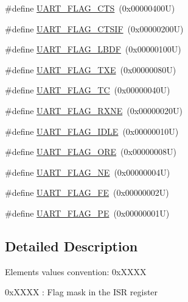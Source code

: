\begin{DoxyCompactItemize}
\item 
\#define \hyperlink{group___u_a_r_t___flags_ga5435edd22ff23de7187654362c48e0b1}{U\+A\+R\+T\+\_\+\+F\+L\+A\+G\+\_\+\+C\+TS}~(0x00000400\+U)
\item 
\#define \hyperlink{group___u_a_r_t___flags_ga0835e6f6bad597b368f03529ed3b96a4}{U\+A\+R\+T\+\_\+\+F\+L\+A\+G\+\_\+\+C\+T\+S\+IF}~(0x00000200\+U)
\item 
\#define \hyperlink{group___u_a_r_t___flags_ga77b81c3c843b49af940862fe4d6ab933}{U\+A\+R\+T\+\_\+\+F\+L\+A\+G\+\_\+\+L\+B\+DF}~(0x00000100\+U)
\item 
\#define \hyperlink{group___u_a_r_t___flags_gad39c017d415a7774c82eb07413a9dbe4}{U\+A\+R\+T\+\_\+\+F\+L\+A\+G\+\_\+\+T\+XE}~(0x00000080\+U)
\item 
\#define \hyperlink{group___u_a_r_t___flags_ga82e68a0ee4a8b987a47c66fc6f744894}{U\+A\+R\+T\+\_\+\+F\+L\+A\+G\+\_\+\+TC}~(0x00000040\+U)
\item 
\#define \hyperlink{group___u_a_r_t___flags_ga9d1b2860d84a87abb05c3b2fed3c108c}{U\+A\+R\+T\+\_\+\+F\+L\+A\+G\+\_\+\+R\+X\+NE}~(0x00000020\+U)
\item 
\#define \hyperlink{group___u_a_r_t___flags_ga5d7a320c505672f7508e3bd99f532a69}{U\+A\+R\+T\+\_\+\+F\+L\+A\+G\+\_\+\+I\+D\+LE}~(0x00000010\+U)
\item 
\#define \hyperlink{group___u_a_r_t___flags_ga335a5b0f61512223bbc406b38c95b2d6}{U\+A\+R\+T\+\_\+\+F\+L\+A\+G\+\_\+\+O\+RE}~(0x00000008\+U)
\item 
\#define \hyperlink{group___u_a_r_t___flags_ga665981434d02ff5296361782c1a7d4b5}{U\+A\+R\+T\+\_\+\+F\+L\+A\+G\+\_\+\+NE}~(0x00000004\+U)
\item 
\#define \hyperlink{group___u_a_r_t___flags_gafba4891ce21cf5223ca5fede0eac388d}{U\+A\+R\+T\+\_\+\+F\+L\+A\+G\+\_\+\+FE}~(0x00000002\+U)
\item 
\#define \hyperlink{group___u_a_r_t___flags_gad5b96f73f6d3a0b58f07e2e9d7bf14d9}{U\+A\+R\+T\+\_\+\+F\+L\+A\+G\+\_\+\+PE}~(0x00000001\+U)
\end{DoxyCompactItemize}


\subsection{Detailed Description}
Elements values convention\+: 0x\+X\+X\+XX
\begin{DoxyItemize}
\item 0x\+X\+X\+XX \+: Flag mask in the I\+SR register 
\end{DoxyItemize}

